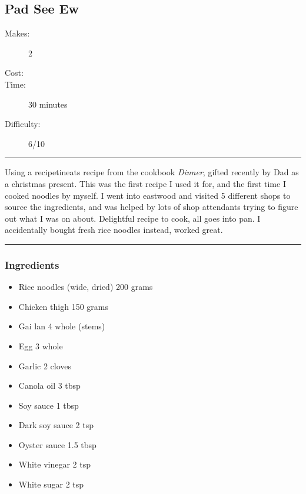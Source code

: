 \documentclass[]{article}
\begin{document}
\subsection*{\center\huge Pad See Ew}
\begin{description}
\item[Makes:] 2 
\item[Cost:] \textdollar
\item[Time:] 30 minutes
\item[Difficulty:] 6/10
\end{description}
\vspace{0.2cm}\hrule\vspace{0.5cm}
\begin{adjustwidth}{0.5 cm}{0.5 cm}

Using a recipetineats recipe from the cookbook \textit{Dinner}, gifted recently by Dad as a christmas present. This was the first recipe I used it for, and the first time I cooked noodles by myself. I went into eastwood and visited 5 different shops to source the ingredients, and was helped by lots of shop attendants trying to figure out what I was on about. Delightful recipe to cook, all goes into pan. I accidentally bought fresh rice noodles instead, worked great. \hfill{}\color{black}

\end{adjustwidth}
\vspace{0.5cm}\hrule
\subsubsection*{\Large Ingredients}
\begin{multicols}{2}
\begin{itemize}
 \item Rice noodles (wide, dried) \hfill 200 grams
 \item Chicken thigh \hfill 150 grams
 \item Gai lan \hfill 4 whole (stems)
 \item Egg \hfill 3 whole
 \item Garlic \hfill 2 cloves
 \item Canola oil \hfill 3 tbsp
 \item Soy sauce \hfill 1 tbsp
 \item Dark soy sauce \hfill 2 tsp
 \item Oyster sauce \hfill 1.5 tbsp
 \item White vinegar \hfill 2 tsp
 \item White sugar \hfill 2 tsp
\end{itemize}
\end{multicols}
\end{document}
